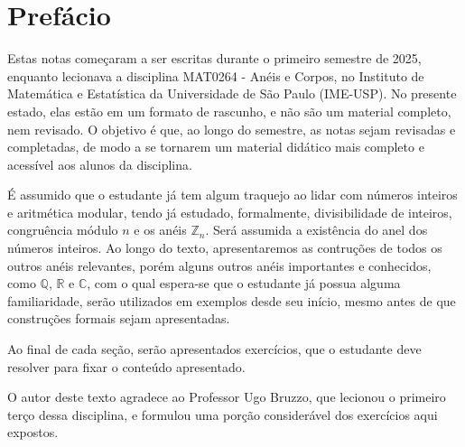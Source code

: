 \chapter{Prefácio}

Estas notas começaram a ser escritas durante o primeiro semestre de 2025, enquanto lecionava a disciplina MAT0264 - Anéis e Corpos, no Instituto de Matemática e Estatística da Universidade de São Paulo (IME-USP).
No presente estado, elas estão em um formato de rascunho, e não são um material completo, nem revisado. O objetivo é que, ao longo do semestre, as notas sejam revisadas e completadas, de modo a se tornarem um material didático mais completo e acessível aos alunos da disciplina.

É assumido que o estudante já tem algum traquejo ao lidar com números inteiros e aritmética modular, tendo já estudado, formalmente, divisibilidade de inteiros, congruência módulo $n$ e os anéis $\mathbb Z_n$.
Será assumida a existência do anel dos números inteiros.
Ao longo do texto, apresentaremos as contruções de todos os outros anéis relevantes, porém alguns outros anéis importantes e conhecidos, como $\mathbb Q$, $\mathbb R$ e $\mathbb C$, com o qual espera-se que o estudante já possua alguma familiaridade, serão utilizados em exemplos desde seu início, mesmo antes de que construções formais sejam apresentadas.

Ao final de cada seção, serão apresentados exercícios, que o estudante deve resolver para fixar o conteúdo apresentado.

O autor deste texto agradece ao Professor Ugo Bruzzo, que lecionou o primeiro terço dessa disciplina, e formulou uma porção considerável dos exercícios aqui expostos.